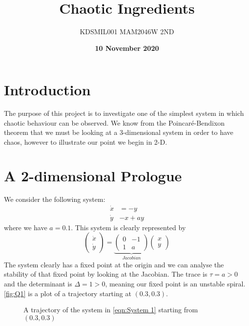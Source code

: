 \documentclass[12pt]{article}
\title{Chaotic Ingredients}
\author{KDSMIL001 \; MAM2046W 2ND}
\date{\textbf{10 November 2020}}
\numberwithin{equation}{section}
\numberwithin{figure}{section}
\numberwithin{table}{section}
\begin{document}
    \maketitle
    
    \section{Introduction}\label{sec:Introduction}
    The purpose of this project is to investigate one of the simplest system in which chaotic 
    behaviour can be observed. We know from the Poincar\'{e}-Bendixon theorem that we must 
    be looking at a 3-dimensional system in order to have chaos, however to illustrate our 
    point we begin in 2-D.

    \section{A 2-dimensional Prologue}\label{sec:Prologue}
    We consider the following system:
    \begin{align*}
        \dot x&=-y\\
        \dot y&-x+ay
    \end{align*}
    where we have $a=0.1$. This system is clearly represented by 
    \begin{equation}
        \begin{pmatrix}
            \dot x \\
            \dot y
        \end{pmatrix}=
        \underbrace{
        \begin{pmatrix}
            0 & -1\\
            1 & a
        \end{pmatrix}}_{Jacobian}
        \begin{pmatrix}
            x \\
            y
        \end{pmatrix}
        \label{eqn:System 1}
    \end{equation}
    The system clearly has a fixed point at the origin and we can analyse the stability of that 
    fixed point by looking at the Jacobian. The trace is $\tau=a>0$ and the determinant is 
    $\Delta=1>0$, meaning our fixed point is an unstable spiral. \autoref{fig:Q1} is a plot of 
    a trajectory starting at $(0.3,0.3)$.
    \begin{figure}[H]
        \begin{center}
           \caption{A trajectory of the system in \autoref{eqn:System 1} starting from $(0.3,0.3)$}
           \label{fig:Q1}
        \end{center}
    \end{figure}
    
\end{document}
